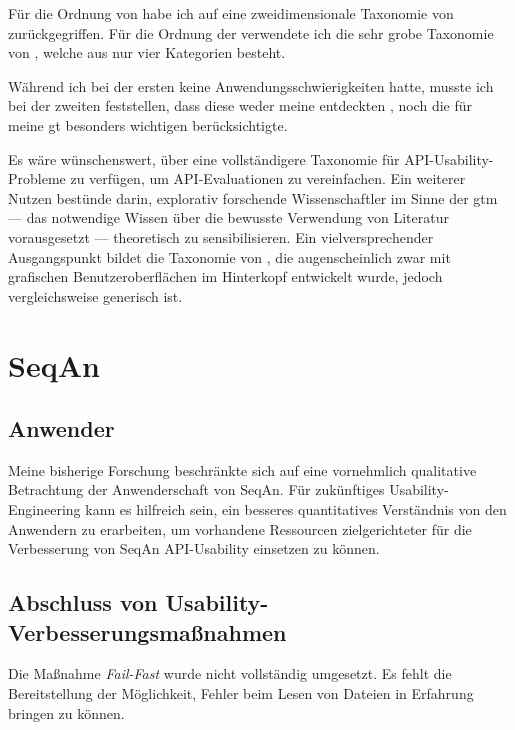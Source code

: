 Für die Ordnung von  habe ich auf eine zweidimensionale Taxonomie von \cite{Stylos:2007ip} zurückgegriffen. Für die Ordnung der  verwendete ich die sehr grobe Taxonomie von \cite{Grill:2012jm}, welche aus nur vier Kategorien besteht.

Während ich bei der ersten keine Anwendungsschwierigkeiten hatte, musste ich bei der zweiten feststellen, dass diese weder meine entdeckten , noch die für meine \gls{gt} besonders wichtigen  berücksichtigte.

Es wäre wünschenswert, über eine vollständigere Taxonomie für API-Usability-Probleme zu verfügen, um API-Evaluationen zu vereinfachen. Ein weiterer Nutzen bestünde darin, explorativ forschende Wissenschaftler im Sinne der \gls{gtm} --- das notwendige Wissen über die bewusste Verwendung von Literatur vorausgesetzt --- theoretisch zu sensibilisieren. Ein vielversprechender Ausgangspunkt bildet die Taxonomie von \cite{Khajouei:2011bm}, die augenscheinlich zwar mit grafischen Benutzeroberflächen im Hinterkopf entwickelt wurde, jedoch vergleichsweise generisch ist.




\section{SeqAn}

\subsection{Anwender}

Meine bisherige Forschung beschränkte sich auf eine vornehmlich qualitative Betrachtung der Anwenderschaft von SeqAn. Für zukünftiges Usability-Engineering kann es hilfreich sein, ein besseres quantitatives Verständnis von den Anwendern zu erarbeiten, um vorhandene Ressourcen zielgerichteter für die Verbesserung von SeqAn API-Usability einsetzen zu können.

\subsection{Abschluss von Usability-Verbesserungsmaßnahmen}

Die Maßnahme \textit{Fail-Fast} wurde nicht vollständig umgesetzt. Es fehlt die Bereitstellung der Möglichkeit, Fehler beim Lesen von Dateien in Erfahrung bringen zu können.

